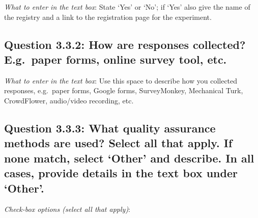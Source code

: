 \documentclass[11pt,a4paper]{article}
\begin{document}
\noindent\textit{What to enter in the text box}: State `Yes' or `No'; if `Yes' also give the name of the registry and a link to the registration page for the experiment.

\subsection*{Question 3.3.2: How are responses collected? E.g.\ paper forms, online survey tool, etc.}

\noindent\textit{What to enter in the text box}: Use this space to describe how you collected responses, e.g.\ paper forms, Google forms, SurveyMonkey, Mechanical Turk, CrowdFlower, audio/video recording, etc. 

\subsection*{Question 3.3.3:  What quality assurance methods are used? Select all that apply.   If none match, select `Other' and describe. In all cases, provide details in the text box under `Other'.}
\vspace{-.1cm}

\vspace{.3cm}
\noindent\textit{Check-box options (select all that apply)}:  
\vspace{-.1cm}
\end{document}
